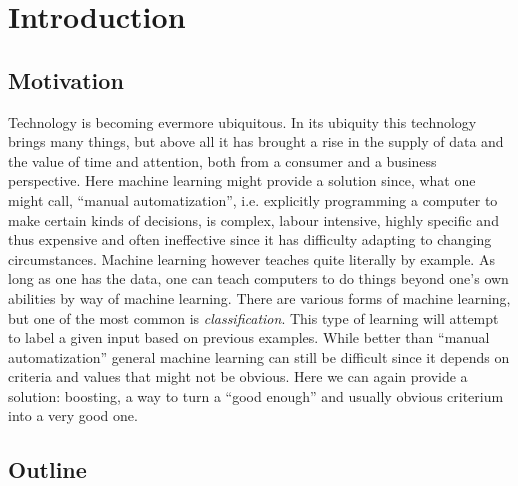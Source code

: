 
\chapter{Introduction}
\label{chap:intro}
\section{Motivation}
\label{sec:motiv}

Technology is becoming evermore ubiquitous. In its ubiquity this technology brings many things, but above all it has brought a rise in the supply of data and the value of time and attention, both from a consumer and a business perspective. Here machine learning might provide a solution since, what one might call, ``manual automatization'', i.e. explicitly programming a computer to make certain kinds of decisions, is complex, labour intensive, highly specific and thus expensive and often ineffective since it has difficulty adapting to changing circumstances. Machine learning however teaches quite literally by example. As long as one has the data, one can teach computers to do things beyond one's own abilities by way of machine learning. There are various forms of machine learning, but one of the most common is \textit{classification}. This type of learning will attempt to label a given input based on previous examples. While better than ``manual automatization'' general machine learning can still be difficult since it depends on criteria and values that might not be obvious. Here we can again provide a solution: boosting, a way to turn a ``good enough'' and usually obvious criterium into a very good one.

\section{Outline}
